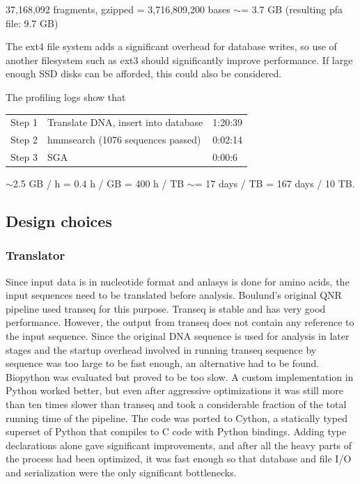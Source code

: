 \documentclass[a4paper,12pt]{article}
\begin{document}
37,168,092 fragments, gzipped = 3,716,809,200 bases $\sim$= 3.7 GB (resulting pfa file: 9.7 GB)

The ext4 file system adds a significant overhead for database writes, so use of another filesystem such as ext3 should significantly improve performance. If large enough SSD disks can be afforded, this could also be considered.

The profiling logs show that 

\begin{tabular}{lll}
Step 1&Translate DNA, insert into database&1:20:39\\
Step 2&hmmsearch (1076 sequences passed)&0:02:14\\
Step 3&SGA&0:00:6
\end{tabular}


$\sim$2.5 GB / h = 0.4 h / GB = 400 h / TB $\sim$= 17 days / TB = 167 days / 10 TB.


 
\subsection{Design choices}
\subsubsection{Translator}
Since input data is in nucleotide format and anlasys is done for amino acids, the input sequences need to be translated before analysis. Boulund's original QNR pipeline used transeq for this purpose. Transeq is stable and has very good performance. However, the output from transeq does not contain any reference to the input sequence. Since the original DNA sequence is used for analysis in later stages and the startup overhead involved in running transeq sequence by sequence was too large to be fast enough, an alternative had to be found. Biopython was evaluated but proved to be too slow. A custom implementation in Python worked better, but even after aggressive optimizations it was still more than ten times slower than transeq and took a considerable fraction of the total running time of the pipeline. The code was ported to Cython, a statically typed superset of Python that compiles to C code with Python bindings. Adding type declarations alone gave significant improvements, and after all the heavy parts of the process had been optimized, it was fast enough so that database and file I/O and serialization were the only significant bottlenecks.
\end{document}
